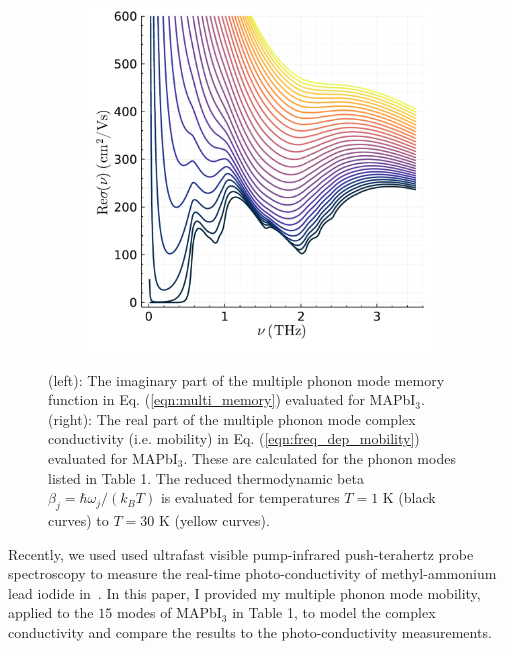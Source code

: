 \begin{figure}[t]
{\begin{subfigure}[b]{.6\textwidth}
\includegraphics[width=.9\textwidth]{chapters/frohlich/figures/zero_conduct.pdf}
\end{subfigure}%
}
\caption{(left): The imaginary part of the multiple phonon mode memory function in Eq. (\ref{eqn:multi_memory}) evaluated for MAPbI$_3$. (right): The real part of the multiple phonon mode complex conductivity (i.e. mobility) in Eq. (\ref{eqn:freq_dep_mobility}) evaluated for MAPbI$_3$. These are calculated for the phonon modes listed in Table 1. The reduced thermodynamic beta $\beta_j = \hbar \omega_j / (k_B T)$ is evaluated for temperatures $T = 1$ K (black curves) to $T = 30$ K (yellow curves).}
\label{fig:athermal_thz}
\end{figure}

Recently, we used used ultrafast visible pump-infrared push-terahertz probe spectroscopy to measure the real-time photo-conductivity of methyl-ammonium lead iodide in~\cite{zheng_multipulse_2021}. In this paper, I provided my multiple phonon mode mobility, applied to the $15$ modes of MAPbI$_3$ in Table 1, to model the complex conductivity and compare the results to the photo-conductivity measurements. 


